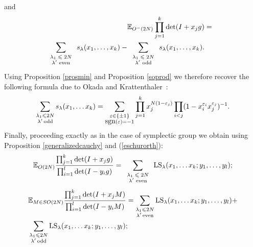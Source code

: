 \documentclass[11pt]{amsart}
\newcommand{\tmop}[1]{\ensuremath{\operatorname{#1}}}
\newcommand{\tmscript}[1]{\text{\scriptsize $#1$}}
\newcommand{\HS}{{\hbox{\rm LS}}}
\newcommand{\sgn}{{\hbox{\rm sgn}}}
\begin{document}
and
\begin{eqnarray*}
  \mathbb{E}_{O^- ( 2 N )} \prod_{j = 1}^k \det ( I + x_j g ) & = & \\
  \sum_{\tmscript{\begin{array}{c}
    \lambda_1 \leqslant 2 N\\
    \text{$\lambda'$ even}
  \end{array}}} s_{\lambda} ( x_1, \ldots, x_k ) -
  \sum_{\tmscript{\begin{array}{c}
    \lambda_1 \leqslant 2 N\\
    \text{$\lambda'$ odd}
  \end{array}}} s_{\lambda} ( x_1, \ldots, x_k ).&  &
\end{eqnarray*}
Using Proposition \ref{prosmin} and Proposition \ref{soprod} we
therefore recover the following formula due to Okada {\cite{ok}}
and Krattenthaler~{\cite{krat}}:
\begin{equation} \label{oke2} \sum_{
\substack{\lambda_1 \leqslant 2N
\\ \lambda' \,
\text{odd}}}s_{\lambda}(x_1, \ldots x_k) = \sum_{\substack{\varepsilon\in\{\pm 1\}\\
\sgn(\varepsilon)= -1 }}\prod_{j=1}^{k}x_j^{N (1-\varepsilon_j) }
\prod_{i < j}(1-x_i^{\varepsilon_i}x_j^{\varepsilon_j})^{-1}.
\end{equation}
Finally, proceeding exactly as in the case of symplectic group we
obtain using Proposition \ref{generalizedcauchy} and
(\ref{eschurorth}):
\[ \label{elabd} \mathbb{E}_{O ( 2 N )} \frac{\prod_{j = 1}^k \det ( I + x_j g
   )}{\prod_{i = 1}^l \det ( I - y_i g )} = \sum_{\tmscript{\begin{array}{c}
     \lambda_1 \leqslant 2 N\\
     \text{$\lambda'$ even}
   \end{array}}} \tmop{LS}_{\lambda} ( x_1, \ldots x_k ; y_1, \ldots, y_l ) ;
\]
\begin{equation*} \begin{aligned}& {\mathbb E}_{M \in SO(2N)}
\frac{\prod_{j=1}^k \det (I+ x_j M)}{\prod_{i=1}^l \det (I-y_i M)}
= \sum_{ \substack{\lambda_1 \leqslant 2N \\ \lambda' \,
\text{even}}}\HS_{\lambda}(x_1, \ldots x_k; y_1, \ldots, y_l) +\\
&\sum_{ \substack{\lambda_1 \leqslant 2N \\ \lambda' \,
\text{odd}}}\HS_{\lambda}(x_1, \ldots x_k; y_1, \ldots, y_l);
\end{aligned}
\end{equation*}
\end{document}
